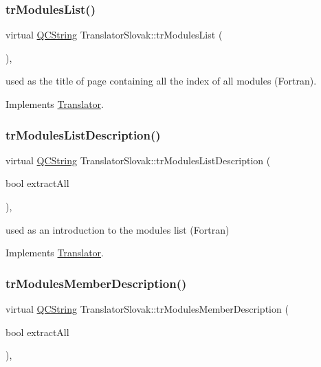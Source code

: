 \subsubsection{\texorpdfstring{trModulesList()}{trModulesList()}}
{\footnotesize\ttfamily virtual \mbox{\hyperlink{class_q_c_string}{Q\+C\+String}} Translator\+Slovak\+::tr\+Modules\+List (\begin{DoxyParamCaption}{ }\end{DoxyParamCaption})\hspace{0.3cm}{\ttfamily [inline]}, {\ttfamily [virtual]}}

used as the title of page containing all the index of all modules (Fortran). 

Implements \mbox{\hyperlink{class_translator}{Translator}}.

\mbox{\label{class_translator_slovak_a1ce4fb30dcc4e45536dc0a52b55c23bd}} 
\subsubsection{\texorpdfstring{trModulesListDescription()}{trModulesListDescription()}}
{\footnotesize\ttfamily virtual \mbox{\hyperlink{class_q_c_string}{Q\+C\+String}} Translator\+Slovak\+::tr\+Modules\+List\+Description (\begin{DoxyParamCaption}\item[{bool}]{extract\+All }\end{DoxyParamCaption})\hspace{0.3cm}{\ttfamily [inline]}, {\ttfamily [virtual]}}

used as an introduction to the modules list (Fortran) 

Implements \mbox{\hyperlink{class_translator}{Translator}}.

\mbox{\label{class_translator_slovak_a1ac61af10a79f3b9d20872536d653816}} 
\subsubsection{\texorpdfstring{trModulesMemberDescription()}{trModulesMemberDescription()}}
{\footnotesize\ttfamily virtual \mbox{\hyperlink{class_q_c_string}{Q\+C\+String}} Translator\+Slovak\+::tr\+Modules\+Member\+Description (\begin{DoxyParamCaption}\item[{bool}]{extract\+All }\end{DoxyParamCaption})\hspace{0.3cm}{\ttfamily [inline]}, {\ttfamily [virtual]}}

